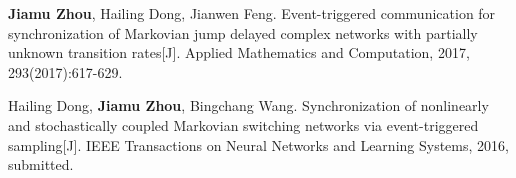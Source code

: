 \begin{publications}{99}\addtolength{\itemsep}{-2.5ex}\setlength{\itemsep}{0cm}
\item   \textbf{Jiamu Zhou}, Hailing Dong, Jianwen Feng.
        Event-triggered communication for synchronization of Markovian jump delayed complex networks with partially unknown transition rates[J]. Applied Mathematics and Computation, 2017, 293(2017):617-629.
\item   Hailing Dong, \textbf{Jiamu Zhou}, Bingchang Wang.
        Synchronization of nonlinearly and stochastically coupled Markovian switching networks via event-triggered sampling[J]. IEEE Transactions on Neural Networks and Learning Systems, 2016, submitted.
\end{publications}

